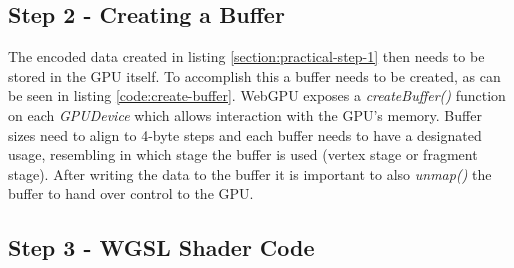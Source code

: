 %
%

\subsection{Step 2 - Creating a Buffer}

The encoded data created in listing \ref*{section:practical-step-1} then needs to be stored in the GPU itself. To accomplish this a buffer needs to be created, as can be seen in listing \ref*{code:create-buffer}. 
WebGPU exposes a \emph{createBuffer()} function on each \emph{GPUDevice} which allows interaction with the GPU's memory. Buffer sizes need to align to 4-byte steps and each buffer needs to 
have a designated usage, resembling in which stage the buffer is used (vertex stage or fragment stage). After writing the data to the buffer it is important to also \emph{unmap()} the buffer 
to hand over control to the GPU. 

\begin{samepage}
  
    {
      An exemplary illustration of how instructions and data of a 3D scene have to be handled
      to use WebGPU.
    }},
    language=JavaScript,
    firstnumber=1,
    label=code:create-buffer
    ]
    {listings/helper.ts}
\end{samepage}

%


\subsection{Step 3 - WGSL Shader Code}
\label{section:shader-code}

